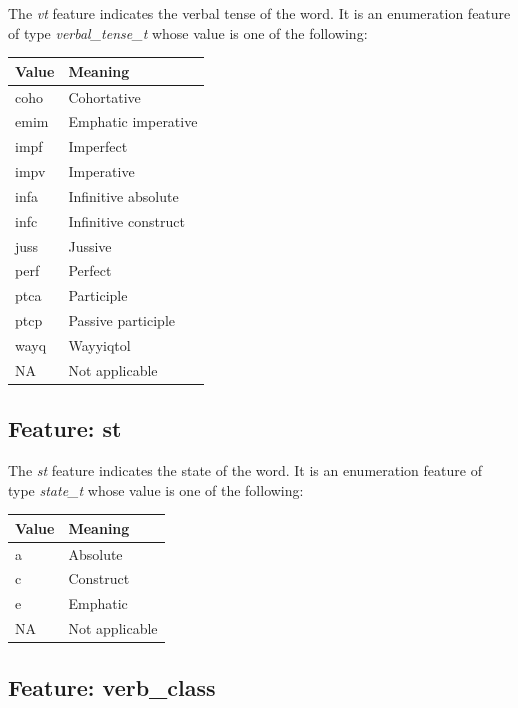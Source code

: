 \documentclass[11pt,oneside,a4paper]{memoir}
\begin{document}
The \emph{vt} feature indicates the verbal tense of the word. It is an enumeration feature of type
\emph{verbal\_tense\_t} whose value is one of the following:

\begin{center}
  \begin{tabular}{ll}
    \textbf{Value} & \textbf{Meaning}\\
    \hline
    coho & Cohortative\\
    emim & Emphatic imperative\\
    impf & Imperfect\\
    impv & Imperative\\
    infa & Infinitive absolute\\
    infc & Infinitive construct\\
    juss & Jussive\\
    perf & Perfect\\
    ptca & Participle\\
    ptcp & Passive participle\\
    wayq & Wayyiqtol\\
    NA   & Not applicable\\
  \end{tabular}
\end{center}

\subsection{Feature: st}

The \emph{st} feature indicates the state of the word. It is an enumeration feature of type
\emph{state\_t} whose value is one of the following:

\begin{center}
  \begin{tabular}{ll}
    \textbf{Value} & \textbf{Meaning}\\
    \hline
    a & Absolute\\
    c & Construct\\
    e & Emphatic\\
    NA & Not applicable\\
  \end{tabular}
\end{center}


\subsection{Feature: verb\_class}
\end{document}
